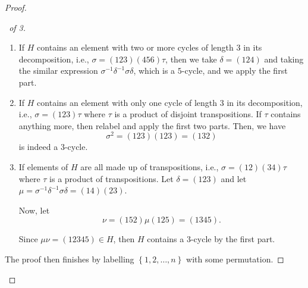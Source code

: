 \documentclass{article}
\theoremstyle{definition}
\theoremstyle{remark}
\newcommand{\Bqty}[1]{\left\{#1\right\}}
\newcommand{\perm}[1]{(#1)}
\newcommand{\inverse}{^{-1}}
\begin{document}
\begin{proof}
\begin{proof}[\proofname\ of 3]
\begin{enumerate}
            Since \(\tau\) is disjoint with \(\Bqty{1, 2, 3}\) by assumption, it commutes with \(\delta\), and by assumption, also with \(\perm{1 2 {\ldots} r}\).

            We now expand this product to get
            \begin{align*}
                \sigma\inverse \delta\inverse \sigma \delta &= \perm{r {\ldots} 2 1} \perm{1 3 2} \perm{1 2 {\ldots} r} \perm{1 2 3}\\
                &= \perm{2 3 r},
            \end{align*}
            which gives a \(3\)-cycle.

            \item If \(H\) contains an element with two or more cycles of length \(3\) in its decomposition, i.e., \(\sigma = \perm{1 2 3} \perm{4 5 6} \tau\), then we take \(\delta = \perm{1 2 4}\) and taking the similar expression \(\sigma \inverse \delta \inverse \sigma \delta\), which is a \(5\)-cycle, and we apply the first part.
            
            \item If \(H\) contains an element with only one cycle of length \(3\) in its decomposition, i.e., \(\sigma = \perm{1 2 3} \tau\) where \(\tau\) is a product of disjoint transpositions. If \(\tau\) contains anything more, then relabel and apply the first two parts. Then, we have
            \[
                \sigma^2 = \perm{1 2 3} \perm{1 2 3} = \perm{1 3 2}
            \]
            is indeed a \(3\)-cycle.

            \item If elements of \(H\) are all made up of transpositions, i.e., \(\sigma = \perm{12} \perm{34} \tau\) where \(\tau\) is a product of transpositions. Let \(\delta = \perm{1 2 3}\) and let \(\mu = \sigma\inverse \delta\inverse \sigma \delta = \perm{14} \perm{23}\).
            
            Now, let
            \[
                \nu = \perm{1 5 2} \mu \perm{1 2 5} = \perm{1 3 4 5}.
            \]

            Since \(\mu \nu = \perm{1 2 3 4 5} \in H\), then \(H\) contains a \(3\)-cycle by the first part. 
        \end{enumerate}

        The proof then finishes by labelling \(\Bqty{1, 2, \ldots, n}\) with some permutation.
    \end{proof}
\end{proof}
\end{document}

